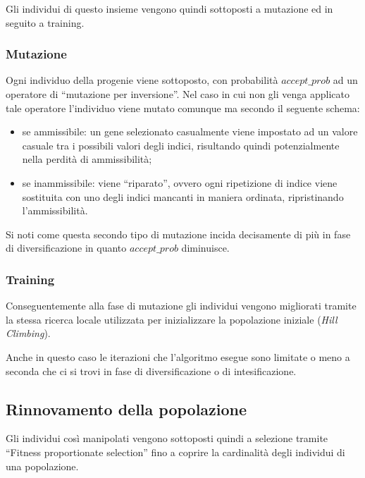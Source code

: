 \documentclass[a4paper]{article}
\begin{document}
            Gli individui di questo insieme vengono quindi sottoposti a mutazione ed in seguito a training.

            \subsubsection{Mutazione}
                Ogni individuo della progenie viene sottoposto, con probabilit\`a $accept\_prob$ ad un operatore di ``mutazione per inversione''.
                Nel caso in cui non gli venga applicato tale operatore l'individuo viene mutato comunque ma secondo il seguente schema:
                \begin{itemize}
                    \item se ammissibile: un gene selezionato casualmente viene impostato ad un valore casuale tra i possibili valori degli indici,
                        risultando quindi potenzialmente nella perdit\`a di ammissibilit\`a;
                    \item se inammissibile: viene ``riparato'', ovvero ogni ripetizione di indice viene sostituita con uno degli indici mancanti in maniera ordinata,
                        ripristinando l'ammissibilit\`a.
                \end{itemize}

                Si noti come questa secondo tipo di mutazione incida decisamente di pi\`u in fase di diversificazione in quanto $accept\_prob$ diminuisce.

            \subsubsection{Training}
                Conseguentemente alla fase di mutazione gli individui vengono migliorati tramite la stessa ricerca locale utilizzata per inizializzare
                la popolazione iniziale (\emph{Hill Climbing}).

                Anche in questo caso le iterazioni che l'algoritmo esegue sono limitate o meno a seconda che ci si trovi in fase di diversificazione o di intesificazione.

        \subsection{Rinnovamento della popolazione}
            Gli individui cos\`i manipolati vengono sottoposti quindi a selezione tramite ``Fitness proportionate selection'' fino a coprire la
            cardinalit\`a degli individui di una popolazione.
\end{document}
